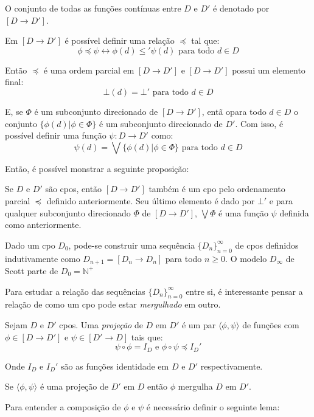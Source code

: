 \documentclass[../main.tex]{subfiles}
\begin{document}
O conjunto de todas as funções contínuas entre $D$ e $D'$ é denotado por $[D \to D']$.

Em $[D \to D']$ é possível definir uma relação $\preceq$ tal que: $$\phi \preceq \psi \leftrightarrow \phi (d) \leq' \psi (d) \text{ para todo } d \in D$$

Então $\preceq$ é uma ordem parcial em $[D \to D']$ e $[D \to D']$ possui um elemento final: $$\bot (d) = \bot' \text{ para todo } d \in D$$

E, se $\Phi$ é um subconjunto direcionado de $[D \to D']$, entã opara todo $d \in D$ o conjunto $\{\phi(d) | \phi \in \Phi\}$ é um subconjunto direcionado de $D'$. Com isso, é possível definir uma função $\psi : D \to D'$ como: $$\psi (d) = \bigvee \{\phi (d) | \phi \in \Phi\} \text{ para todo } d \in D$$

Então, é possível monstrar a seguinte proposição:

\begin{proposition}
    Se $D$ e $D'$ são cpos, então $[D \to D']$ também é um cpo pelo ordenamento parcial $\preceq$ definido anteriormente. Seu último elemento é dado por $\bot'$ e para qualquer subconjunto direcionado $\Phi$ de $[D \to D']$, $\bigvee \Phi$ é uma função $\psi$ definida como anteriormente.
\end{proposition}

Dado um cpo $D_0$, pode-se construir uma sequência $\{D_n\}^{\infty}_{n=0}$ de cpos definidos indutivamente como $D_{n + 1} = [D_n \to D_n]$ para todo $n \geq 0$. O modelo $D_{\infty}$ de Scott parte de $D_0 = \mathbb{N}^+$

Para estudar a relação das sequências $\{D_n\}^{\infty}_{n=0}$ entre si, é interessante pensar a relação de como um cpo pode estar \emph{mergulhado} em outro.

\begin{definition}
    Sejam $D$ e $D'$ cpos. Uma \emph{projeção} de $D$ em $D'$ é um par $\langle \phi, \psi \rangle$ de funções com $\phi \in [D \to D']$ e $\psi \in [D' \to D]$ tais que: $$\psi \circ \phi = I_D \text{ e } \phi \circ \psi \preceq I_D'$$

    Onde $I_D$ e $I_D'$ são as funções identidade em $D$ e $D'$ respectivamente.
\end{definition}

Se $\langle \phi, \psi \rangle$ é uma projeção de $D'$ em $D$ então $\phi$ mergulha $D$ em $D'$.

Para entender a composição de $\phi$ e $\psi$ é necessário definir o seguinte lema:
\end{document}
